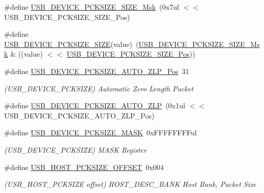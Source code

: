 \begin{DoxyCompactItemize}
\#define \mbox{\hyperlink{group___s_a_m_d21___u_s_b_gac8f37693735e2fd0c6ef9445ba2edd44}{U\+S\+B\+\_\+\+D\+E\+V\+I\+C\+E\+\_\+\+P\+C\+K\+S\+I\+Z\+E\+\_\+\+S\+I\+Z\+E\+\_\+\+Msk}}~(0x7ul $<$$<$ U\+S\+B\+\_\+\+D\+E\+V\+I\+C\+E\+\_\+\+P\+C\+K\+S\+I\+Z\+E\+\_\+\+S\+I\+Z\+E\+\_\+\+Pos)
\item 
\#define \mbox{\hyperlink{group___s_a_m_d21___u_s_b_ga20e48aa7acb99e33e791fd4fb5e8322a}{U\+S\+B\+\_\+\+D\+E\+V\+I\+C\+E\+\_\+\+P\+C\+K\+S\+I\+Z\+E\+\_\+\+S\+I\+ZE}}(value)~(\mbox{\hyperlink{group___s_a_m_d21___u_s_b_gac8f37693735e2fd0c6ef9445ba2edd44}{U\+S\+B\+\_\+\+D\+E\+V\+I\+C\+E\+\_\+\+P\+C\+K\+S\+I\+Z\+E\+\_\+\+S\+I\+Z\+E\+\_\+\+Msk}} \& ((value) $<$$<$ \mbox{\hyperlink{group___s_a_m_d21___u_s_b_ga50418bff1c552e987f4925cb91cf32b9}{U\+S\+B\+\_\+\+D\+E\+V\+I\+C\+E\+\_\+\+P\+C\+K\+S\+I\+Z\+E\+\_\+\+S\+I\+Z\+E\+\_\+\+Pos}}))
\item 
\#define \mbox{\hyperlink{group___s_a_m_d21___u_s_b_ga732b6ff0d44574cf262b94da9a542e0d}{U\+S\+B\+\_\+\+D\+E\+V\+I\+C\+E\+\_\+\+P\+C\+K\+S\+I\+Z\+E\+\_\+\+A\+U\+T\+O\+\_\+\+Z\+L\+P\+\_\+\+Pos}}~31
\begin{DoxyCompactList}\small\item\em (U\+S\+B\+\_\+\+D\+E\+V\+I\+C\+E\+\_\+\+P\+C\+K\+S\+I\+ZE) Automatic Zero Length Packet \end{DoxyCompactList}\item 
\#define \mbox{\hyperlink{group___s_a_m_d21___u_s_b_ga81931185058e5bdc09545fad7b0b23eb}{U\+S\+B\+\_\+\+D\+E\+V\+I\+C\+E\+\_\+\+P\+C\+K\+S\+I\+Z\+E\+\_\+\+A\+U\+T\+O\+\_\+\+Z\+LP}}~(0x1ul $<$$<$ U\+S\+B\+\_\+\+D\+E\+V\+I\+C\+E\+\_\+\+P\+C\+K\+S\+I\+Z\+E\+\_\+\+A\+U\+T\+O\+\_\+\+Z\+L\+P\+\_\+\+Pos)
\item 
\#define \mbox{\hyperlink{group___s_a_m_d21___u_s_b_ga8137db3f78ef7508a990c6394a11e9db}{U\+S\+B\+\_\+\+D\+E\+V\+I\+C\+E\+\_\+\+P\+C\+K\+S\+I\+Z\+E\+\_\+\+M\+A\+SK}}~0x\+F\+F\+F\+F\+F\+F\+F\+Ful
\begin{DoxyCompactList}\small\item\em (U\+S\+B\+\_\+\+D\+E\+V\+I\+C\+E\+\_\+\+P\+C\+K\+S\+I\+ZE) M\+A\+SK Register \end{DoxyCompactList}\item 
\#define \mbox{\hyperlink{group___s_a_m_d21___u_s_b_ga8b233eb580307bb35fcb14e473db9cb0}{U\+S\+B\+\_\+\+H\+O\+S\+T\+\_\+\+P\+C\+K\+S\+I\+Z\+E\+\_\+\+O\+F\+F\+S\+ET}}~0x004
\begin{DoxyCompactList}\small\item\em (U\+S\+B\+\_\+\+H\+O\+S\+T\+\_\+\+P\+C\+K\+S\+I\+ZE offset) H\+O\+S\+T\+\_\+\+D\+E\+S\+C\+\_\+\+B\+A\+NK Host Bank, Packet Size \end{DoxyCompactList}\item 
$$
\end{DoxyCompactItemize}
